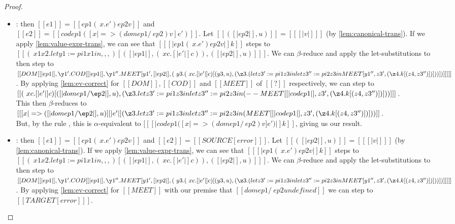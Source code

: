 \documentclass[11pt]{article}
\newcommand{\rrule}[1]{\rref*{#1}}
\begin{document}
\begin{proof}
\begin{itemize}
		\item \rrule{RedAppEv}: then $[[e1]] = [[ ep1 (\ x  . e') ep2 v ]]$ and \\$[[e2]]=[[ cod ep1 ([x |=> (dom ep1 /\ ep2) v]e') ]]$. 
		Let $[[( [|ep2|], u)]] = [[ [|v|] ]]$ (by \autoref{lem:canonical-trans}).
        If we apply \autoref{lem:value-expr-trans}, we can see that $[[  [|ep1 (\ x . e') ep2 v|]k ]]$
        steps to \\$[[ (\ x1  x2. let y1 := pi1 x1 in ,,,)[( [|ep1|] , (\ x c . [|e'|]c )), ( [|ep2|], u) ]  ]]$.
        We can $\beta$-reduce and apply the let-substitutions to then step to
        \\$[[ DOM [ [|ep1|] , \y1' . COD [  [|ep1|] ,  \y1''.  MEET [y1', [|ep2|], (\ y3 . (\ x c . [|e'|]c ) [(y3, u), (\z3 . \\( let z3' := pi1 z3 in let z3'' := pi2 z3 in MEET[y1'', z3', (\z4. k[(z4, z3'')] ) ] ) ) ] )] ] ] ]]$.
        By applying \autoref{lem:ev-correct} for $[[DOM]], [[COD]]$ and $[[MEET]]$ of $[[?]]$ respectively,
        we can step to  
        \\$[[  (\ x c . [|e'|]c ) [([|dom ep1 /\ep2|], u), (\z3 . let z3' := pi1 z3 in let z3'' := pi2 z3 in \\(--MEET[ [|cod ep1|] , z3', (\z4. k[(z4, z3'')] ) ]) ) ] ]]$.
		\\This then $\beta$-reduces to 
		\\$[[  [ x |=> ([|dom ep1 /\ep2|], u) ][|e'|](\z3 . let z3' := pi1 z3 in let z3'' := pi2 z3 in \\(MEET[ [|cod ep1|] , z3', (\z4. k[(z4, z3'')] ) ]) ) ]]$.
		\\But, by the rule \rrule{TransformEv}, this is $\alpha$-equivalent to  $[[ [|cod ep1 ([x |=> (dom ep1 /\ ep2) v]e')|]k ]]$,
		giving us our result.

		\item \rrule{RedAppEvFail}: then $[[e1]] = [[ ep1 (\ x  . e') ep2 v ]]$ and $[[e2]]=[[ SOURCE[error] ]]$.
		Let $[[( [|ep2|], u)]] = [[ [|v|] ]]$ (by \autoref{lem:canonical-trans}).
        If we apply \autoref{lem:value-expr-trans}, we can see that $[[  [|ep1 (\ x  . e') ep2 v|]k ]]$
        steps to \\$[[ (\ x1  x2. let y1 := pi1 x1 in ,,,)[( [|ep1|] , (\ x c . [|e'|]c )), ( [|ep2|], u) ]  ]]$.
        We can $\beta$-reduce and apply the let-substitutions to then step to
        \\$[[ DOM [ [|ep1|] , \y1' . COD [  [|ep1|] , \y1''. MEET [y1', [|ep2|], (\ y3 . (\ x c . [|e'|]c ) [(y3, u), (\z3 . \\( let z3' := pi1 z3 in let z3'' := pi2 z3 in MEET[y1'', z3', (\z4. k[(z4, z3'')] ) ] ) ) ] )] ] ] ]]$.
        By applying \autoref{lem:ev-correct} for $[[MEET]]$ with our premise that $[[dom ep1 /\ ep2 undefined]]$
		we can step to  $[[ TARGET[error] ]]$.
		

\end{itemize}
\end{proof}
\end{document}
